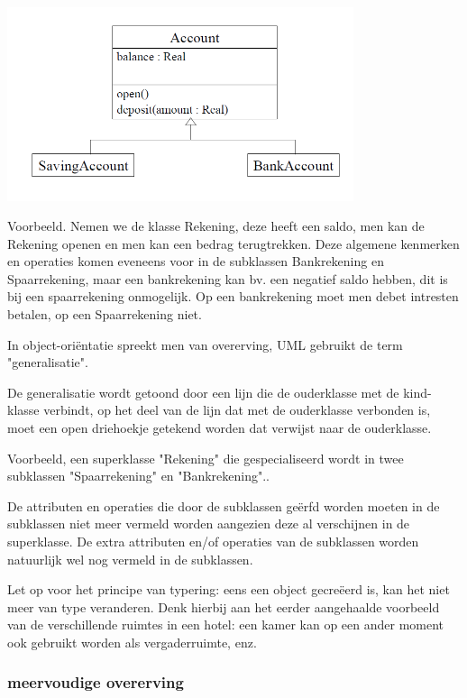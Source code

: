 
\begin{center}
\includegraphics[width=4in]{img/con1}%
\end{center}

Voorbeeld. Nemen we de klasse Rekening, deze heeft een saldo, men kan de Rekening openen en men kan een bedrag terugtrekken. Deze algemene kenmerken en operaties komen eveneens voor in de subklassen Bankrekening en Spaarrekening, maar een bankrekening kan bv. een negatief saldo hebben, dit is bij een spaarrekening onmogelijk. Op een bankrekening moet men debet intresten betalen, op een Spaarrekening niet.

In object-oriëntatie spreekt men van overerving, UML gebruikt de term "generalisatie".

De generalisatie wordt getoond door een lijn die de ouderklasse met de kind- klasse verbindt, op het deel van de lijn dat met de ouderklasse verbonden is, moet een open driehoekje getekend worden dat verwijst naar de ouderklasse.

Voorbeeld, een superklasse "Rekening" die gespecialiseerd wordt in twee subklassen "Spaarrekening" en "Bankrekening"..

De attributen en operaties die door de subklassen geërfd worden moeten in de subklassen niet meer vermeld worden aangezien deze al verschijnen in de superklasse. De extra attributen en/of operaties van de subklassen worden natuurlijk wel nog vermeld in de subklassen.

Let op voor het principe van typering: eens een object gecreëerd is, kan het niet meer van type veranderen. Denk hierbij aan het eerder aangehaalde voorbeeld van de verschillende ruimtes in een hotel: een kamer kan op een ander moment ook gebruikt worden als vergaderruimte, enz.

\subsubsection{meervoudige overerving}


